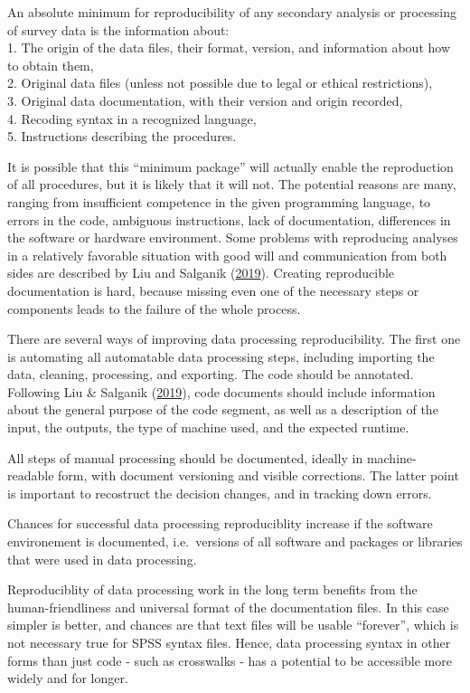 \documentclass[12pt,]{article}
\begin{document}
An absolute minimum for reproducibility of any secondary analysis or processing of survey data is the information about:\\
1. The origin of the data files, their format, version, and information about how to obtain them,\\
2. Original data files (unless not possible due to legal or ethical restrictions),\\
3. Original data documentation, with their version and origin recorded,\\
4. Recoding syntax in a recognized language,\\
5. Instructions describing the procedures.

It is possible that this ``minimum package'' will actually enable the reproduction of all procedures, but it is likely that it will not. The potential reasons are many, ranging from insufficient competence in the given programming language, to errors in the code, ambiguous instructions, lack of documentation, differences in the software or hardware environment. Some problems with reproducing analyses in a relatively favorable situation with good will and communication from both sides are described by Liu and Salganik (\protect\hyperlink{ref-Liu2019}{2019}). Creating reproducible documentation is hard, because missing even one of the necessary steps or components leads to the failure of the whole process.

There are several ways of improving data processing reproducibility. The first one is automating all automatable data processing steps, including importing the data, cleaning, processing, and exporting. The code should be annotated. Following Liu \& Salganik (\protect\hyperlink{ref-Liu2019}{2019}), code documents should include information about the general purpose of the code segment, as well as a description of the input, the outputs, the type of machine used, and the expected runtime.

All steps of manual processing should be documented, ideally in machine-readable form, with document versioning and visible corrections. The latter point is important to recostruct the decision changes, and in tracking down errors.

Chances for successful data processing reproduciblity increase if the software environement is documented, i.e.~versions of all software and packages or libraries that were used in data processing.

Reproduciblity of data processing work in the long term benefits from the human-friendliness and universal format of the documentation files. In this case simpler is better, and chances are that text files will be usable ``forever'', which is not necessary true for SPSS syntax files. Hence, data processing syntax in other forms than just code - such as crosswalks - has a potential to be accessible more widely and for longer.
\end{document}
